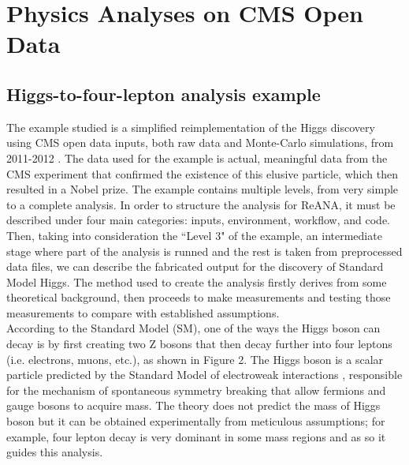 \documentclass[letter]{article}
\newcommand\tab[1][1cm]{\hspace*{#1}}
\begin{document}
\section{Physics Analyses on CMS Open Data}
\label{sec:theory}

\subsection{Higgs-to-four-lepton analysis example}
\tab The example studied is a simplified reimplementation of the Higgs discovery using CMS open data inputs, both raw data and Monte-Carlo simulations, from 2011-2012 \cite{higgs}. The data used for the example is actual, meaningful data from the CMS experiment that confirmed the existence of this elusive particle, which then resulted in a Nobel prize. The example contains multiple levels, from very simple to a complete analysis. In order to structure the analysis for ReANA, it must be described under four main categories: inputs, environment, workflow, and code. Then, taking into consideration the ``Level 3" of the example, an intermediate stage where part of the analysis is runned and the rest is taken from preprocessed data files, we can describe the fabricated output for the discovery of Standard Model Higgs. The method used to create the analysis firstly derives from some theoretical background, then proceeds to make measurements and testing those measurements to compare with established assumptions.
\\ 
\tab According to the Standard Model (SM), one of the ways the Higgs boson can decay is by first creating two Z bosons that then decay further into four leptons (i.e. electrons, muons, etc.), as shown in Figure 2. The Higgs boson is a scalar particle predicted by the Standard Model of electroweak interactions \cite{higgsinfo, higgsinfo2,higgsinfo3}, responsible for the mechanism of spontaneous symmetry breaking that allow fermions and gauge bosons to acquire mass. The theory does not predict the mass of Higgs boson but it can be obtained experimentally from meticulous assumptions; for example, four lepton decay is very dominant in some mass regions and as so it guides this analysis.
\end{document}
